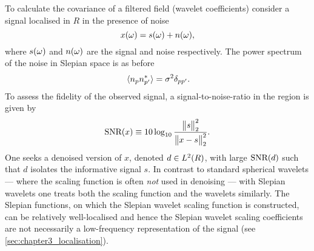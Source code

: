 To calculate the covariance of a filtered field (wavelet coefficients) consider a signal localised in \(R\) in the presence of noise
%
\begin{equation}\label{eq:chapter3_noised_signal}
	\pixel{x} = \pixel{s} + \pixel{n},
\end{equation}
%
where \(\pixel{s}\) and \(\pixel{n}\) are the signal and noise respectively.
The power spectrum of the noise in Slepian space is as before
%
\begin{equation}
	\expval*{\slepian{n} \conj{\slepian[']{n}}}
	= \sigma^{2} \delta_{pp'}.
\end{equation}
%
To assess the fidelity of the observed signal, a signal-to-noise-ratio in the region is given by
%
\begin{equation}
	\snr{x}
	\equiv 10 \log_{10} \frac{\norm{s}^{2}}{\norm{x - s}^{2}}.
\end{equation}
%
One seeks a denoised version of \(x\), denoted \(d \in \hilbert{R}\), with large \(\snr{d}\) such that \(d\) isolates the informative signal \(s\).
In contrast to standard spherical wavelets --- where the scaling function is often \emph{not} used in denoising --- with Slepian wavelets one treats both the scaling function and the wavelets similarly.
The Slepian functions, on which the Slepian wavelet scaling function is constructed, can be relatively well-localised and hence the Slepian wavelet scaling coefficients are not necessarily a low-frequency representation of the signal (see \cref{sec:chapter3_localisation}).

